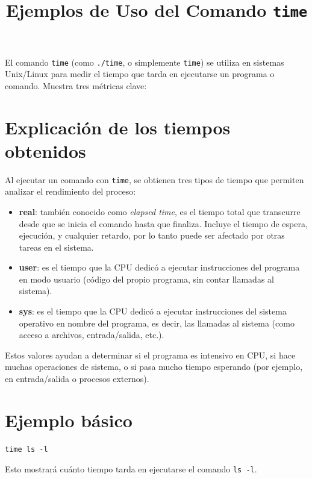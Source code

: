 \documentclass[12pt]{article}
\title{Ejemplos de Uso del Comando \texttt{time}}
\author{}
\date{}
\begin{document}
\maketitle

El comando \texttt{time} (como \texttt{./time}, o simplemente \texttt{time}) se utiliza en sistemas Unix/Linux para medir el tiempo que tarda en ejecutarse un programa o comando. Muestra tres métricas clave:

\section*{Explicación de los tiempos obtenidos}

Al ejecutar un comando con \texttt{time}, se obtienen tres tipos de tiempo que permiten analizar el rendimiento del proceso:

\begin{itemize}
  \item \textbf{real}: también conocido como \textit{elapsed time}, es el tiempo total que transcurre desde que se inicia el comando hasta que finaliza. Incluye el tiempo de espera, ejecución, y cualquier retardo, por lo tanto puede ser afectado por otras tareas en el sistema.
  
  \item \textbf{user}: es el tiempo que la CPU dedicó a ejecutar instrucciones del programa en modo usuario (código del propio programa, sin contar llamadas al sistema).
  
  \item \textbf{sys}: es el tiempo que la CPU dedicó a ejecutar instrucciones del sistema operativo en nombre del programa, es decir, las llamadas al sistema (como acceso a archivos, entrada/salida, etc.).
\end{itemize}

Estos valores ayudan a determinar si el programa es intensivo en CPU, si hace muchas operaciones de sistema, o si pasa mucho tiempo esperando (por ejemplo, en entrada/salida o procesos externos).

\section*{Ejemplo básico}

\begin{lstlisting}
time ls -l
\end{lstlisting}

Esto mostrará cuánto tiempo tarda en ejecutarse el comando \texttt{ls -l}.
\end{document}
